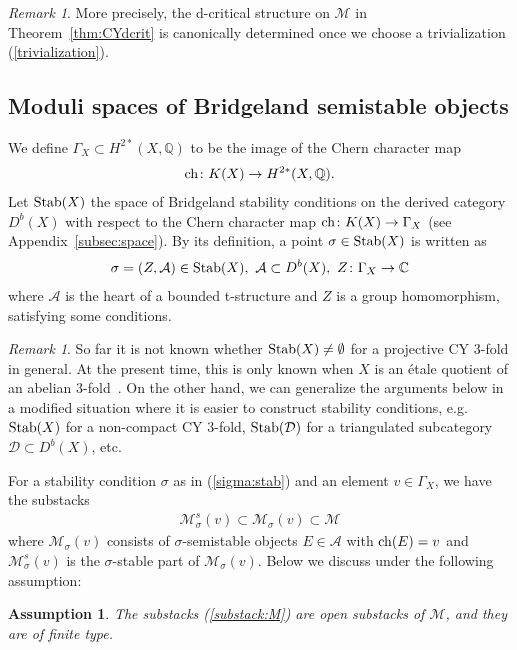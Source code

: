 \documentclass[11pt]{amsart}
\theoremstyle{plain}
\newtheorem{assum}[thm]{Assumption}
\theoremstyle{definition}
\theoremstyle{remark}
\newtheorem{rmk}[thm]{Remark}
\newcommand{\aA}{\mathcal{A}}
\newcommand{\dD}{\mathcal{D}}
\newcommand{\mM}{\mathcal{M}}
\newcommand{\ch}{\mathop{\rm ch}\nolimits}
\newcommand{\Stab}{\mathop{\rm Stab}\nolimits}
\begin{document}
\begin{rmk}\label{rmk:canonical}
More precisely, the d-critical structure on $\mM$
in Theorem~\ref{thm:CYdcrit}
is canonically 
determined once we choose a 
trivialization (\ref{trivialization}). 
\end{rmk}

\subsection{Moduli spaces of Bridgeland semistable objects}\label{subsec:msstable}
We define
$\Gamma_X \subset H^{2\ast}(X, \mathbb{Q})$ to be the image 
of the Chern character map
\begin{align*}
\ch \colon 
K(X) \to H^{2\ast}(X, \mathbb{Q}).
\end{align*}
Let
$\Stab(X)$ the 
space of Bridgeland stability conditions on 
the derived category
$D^b(X)$ with respect to the 
Chern character map $\ch \colon K(X) \to \Gamma_X$
(see Appendix~\ref{subsec:space}). 
By its definition, a point $\sigma \in \Stab(X)$
is written as
\begin{align}\label{sigma:stab}
\sigma=(Z, \aA) \in \Stab(X), \ 
\aA \subset D^b(X), \ Z \colon \Gamma_X \to \mathbb{C}
\end{align}
where $\aA$ is the heart of a bounded t-structure and
$Z$ is a group homomorphism, satisfying
some conditions. 
\begin{rmk}
So far it is not known whether $\Stab(X) \neq \emptyset$ for 
a projective CY 3-fold in general. 
At the present time, this is only known 
when 
$X$ is an \'etale quotient of an 
abelian 3-fold~\cite{MR3370123, MR3573975}. 
On the other hand, we can generalize the arguments below 
in a modified situation where 
it is easier to construct stability conditions, e.g. 
$\Stab(X)$ for a non-compact CY 3-fold, 
$\Stab(\dD)$ for a triangulated subcategory 
$\dD \subset D^b(X)$, etc. 
\end{rmk}
For a stability condition $\sigma$ as in (\ref{sigma:stab})
and an element $v \in \Gamma_X$, 
we have the substacks
\begin{align}\label{substack:M}
\mM_{\sigma}^{s}(v) \subset \mM_{\sigma}(v) 
\subset \mM
\end{align}
where $\mM_{\sigma}(v)$ consists of 
$\sigma$-semistable objects $E \in \aA$
with $\ch(E)=v$
and $\mM_{\sigma}^s(v)$ 
is the $\sigma$-stable part of $\mM_{\sigma}(v)$. 
Below we discuss under 
the following assumption:
\begin{assum}\label{assum:stack}
The substacks (\ref{substack:M}) are open substacks of 
$\mM$, and they are of finite type. 
\end{assum}
\end{document}
